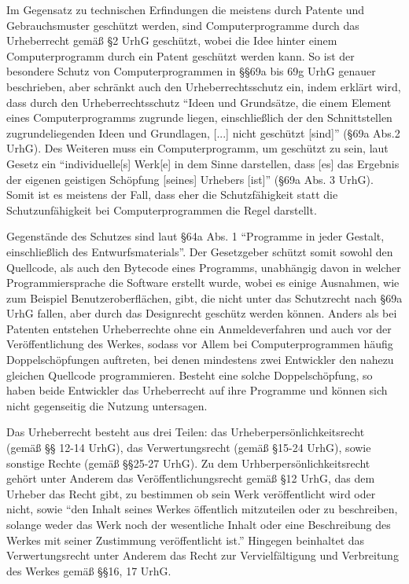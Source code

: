 Im Gegensatz zu technischen Erfindungen die meistens durch Patente und Gebrauchsmuster geschützt werden, sind Computerprogramme durch das Urheberrecht gemäß §2 UrhG geschützt,
wobei die Idee hinter einem Computerprogramm durch ein Patent geschützt werden kann. So ist der besondere Schutz von Computerprogrammen in §§69a bis 69g UrhG genauer beschrieben,
aber schränkt auch den Urheberrechtsschutz ein, indem erklärt wird, dass durch den Urheberrechtsschutz “Ideen und Grundsätze, die einem Element eines Computerprogramms zugrunde liegen, einschließlich der den Schnittstellen zugrundeliegenden Ideen und Grundlagen,
[...] nicht geschützt [sind]” (§69a Abs.2 UrhG).  Des Weiteren muss ein Computerprogramm, um geschützt zu sein, laut Gesetz ein “individuelle[s] Werk[e] in dem Sinne darstellen,
dass [es] das Ergebnis der eigenen geistigen Schöpfung [seines] Urhebers [ist]” (§69a Abs. 3 UrhG). Somit ist es meistens der Fall, dass eher die Schutzfähigkeit statt die Schutzunfähigkeit bei Computerprogrammen die Regel darstellt.

Gegenstände des Schutzes sind laut §64a Abs. 1 “Programme in jeder Gestalt, einschließlich des Entwurfsmaterials”. Der Gesetzgeber schützt somit sowohl den Quellcode,
als auch den Bytecode eines Programms, unabhängig davon in welcher Programmiersprache die Software erstellt wurde, wobei es einige Ausnahmen, wie zum Beispiel Benutzeroberflächen, gibt,
die nicht unter das Schutzrecht nach §69a UrhG fallen, aber durch das Designrecht geschütz werden können. Anders als bei Patenten entstehen Urheberrechte ohne ein Anmeldeverfahren und auch vor der Veröffentlichung des Werkes,
sodass vor Allem bei Computerprogrammen häufig Doppelschöpfungen auftreten, bei denen mindestens zwei Entwickler den nahezu gleichen Quellcode programmieren.
Besteht eine solche Doppelschöpfung, so haben beide Entwickler das Urheberrecht auf ihre Programme und können sich nicht gegenseitig die Nutzung untersagen. 

Das Urheberrecht besteht aus drei Teilen: das Urheberpersönlichkeitsrecht (gemäß §§ 12-14 UrhG), das Verwertungsrecht (gemäß §15-24 UrhG), sowie sonstige Rechte (gemäß §§25-27 UrhG).
Zu dem Urhberpersönlichkeitsrecht gehört unter Anderem das Veröffentlichungsrecht gemäß §12 UrhG, das dem Urheber das Recht gibt, zu bestimmen ob sein Werk veröffentlicht wird oder nicht,
sowie “den Inhalt seines Werkes öffentlich mitzuteilen oder zu beschreiben, solange weder das Werk noch der wesentliche Inhalt oder eine Beschreibung des Werkes mit seiner
Zustimmung veröffentlicht ist.” Hingegen beinhaltet das Verwertungsrecht unter Anderem das Recht zur Vervielfältigung und Verbreitung des Werkes gemäß §§16, 17 UrhG.

